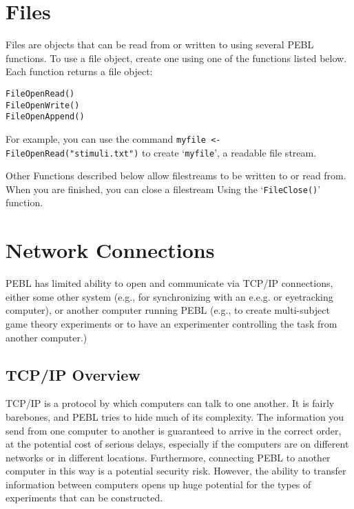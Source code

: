 \section{Files}

Files are objects that can be read from or written to using several PEBL functions. To use a file object, create one using one of the functions 
listed below.  Each function returns a file object:
\begin{verbatim}
FileOpenRead()
FileOpenWrite()
FileOpenAppend()
\end{verbatim}

For example, you can use the command \texttt{myfile <-
  FileOpenRead("stimuli.txt")} 
to create `\texttt{myfile}', a readable
file stream.


Other Functions described below allow filestreams to be written to 
or read from.  When you are finished, you can close a filestream 
Using the `\texttt{FileClose()}' function.


\section{Network Connections}

PEBL has limited ability to open and communicate via  TCP/IP
connections, either some other system (e.g., for synchronizing with an
e.e.g. or eyetracking computer), or another computer running PEBL
(e.g., to create multi-subject game theory experiments or to have an
experimenter controlling the task from another computer.)

\subsection{TCP/IP Overview}
TCP/IP is a protocol by which computers can talk to one another.  It
is fairly barebones, and PEBL tries to hide much of its
complexity. The information you send from one computer to another is
guaranteed to arrive in the correct order, at the potential cost of
serious delays, especially if the computers are on different networks
or in different locations.  Furthermore, connecting PEBL to another
computer in this way is a potential security risk. However, the
ability to transfer information between computers opens up huge
potential for the types of experiments that can be constructed.

